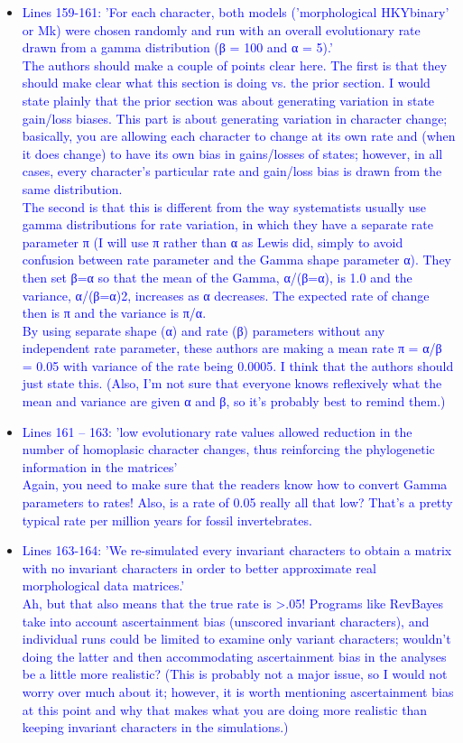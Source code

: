 \documentclass[12pt,letterpaper]{article}
\begin{document}
\begin{itemize}
\item{\textcolor{blue}{Lines 159-161: 'For each character, both models ('morphological HKYbinary' or Mk) were chosen randomly and run with an overall evolutionary rate drawn from a gamma distribution (β = 100 and α = 5).'
\\
The authors should make a couple of points clear here. The first is that they should make clear what this section is doing vs. the prior section. I would state plainly that the prior section was about generating variation in state gain/loss biases. This part is about generating variation in character change; basically, you are allowing each character to change at its own rate and (when it does change) to have its own bias in gains/losses of states; however, in all cases, every character’s particular rate and gain/loss bias is drawn from the same distribution.
\\
The second is that this is different from the way systematists usually use gamma distributions for rate variation, in which they have a separate rate parameter π (I will use π rather than α as Lewis did, simply to avoid confusion between rate parameter and the Gamma shape parameter α). They then set β=α so that the mean of the Gamma, α/(β=α), is 1.0 and the variance, α/(β=α)2, increases as α decreases. The expected rate of change then is π and the variance is π/α.
\\
By using separate shape (α) and rate (β) parameters without any independent rate parameter, these authors are making a mean rate π = α/β = 0.05 with variance of the rate being 0.0005. I think that the authors should just state this. (Also, I’m not sure that everyone knows reflexively what the mean and variance are given α and β, so it’s probably best to remind them.)}}

\item{\textcolor{blue}{Lines 161 – 163: 'low evolutionary rate values allowed reduction in the number of homoplasic character changes, thus reinforcing the phylogenetic information in the matrices'
\\
Again, you need to make sure that the readers know how to convert Gamma parameters to rates! Also, is a rate of 0.05 really all that low? That’s a pretty typical rate per million years for fossil invertebrates.}}


\item{\textcolor{blue}{Lines 163-164: 'We re-simulated every invariant characters to obtain a matrix with no invariant characters in order to better approximate real morphological data matrices.'
\\
Ah, but that also means that the true rate is >.05! Programs like RevBayes take into account ascertainment bias (unscored invariant characters), and individual runs could be limited to examine only variant characters; wouldn’t doing the latter and then accommodating ascertainment bias in the analyses be a little more realistic? (This is probably not a major issue, so I would not worry over much about it; however, it is worth mentioning ascertainment bias at this point and why that makes what you are doing more realistic than keeping invariant characters in the simulations.)}}


\end{itemize}
\end{document}
